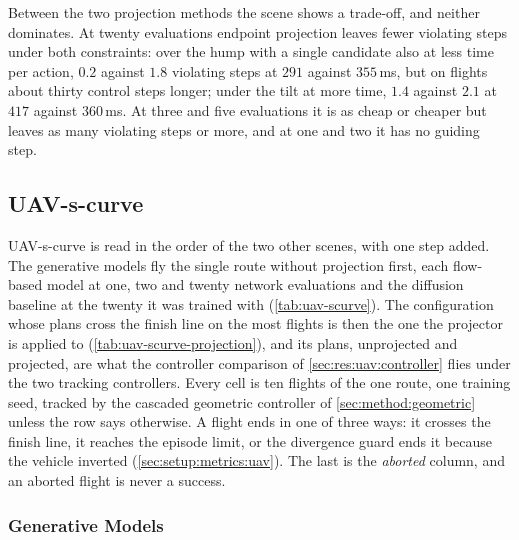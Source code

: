 Between the two projection methods the scene shows a trade-off, and neither dominates. At twenty evaluations
endpoint projection leaves fewer violating steps under both constraints: over the hump with a single
candidate also at less time per action, $0.2$ against $1.8$ violating steps at $291$ against $355$\,ms, but on
flights about thirty control steps longer; under the tilt at more time, $1.4$ against $2.1$ at $417$ against
$360$\,ms. At three and five evaluations it is as cheap or cheaper but leaves as many violating steps or more,
and at one and two it has no guiding step.

\FloatBarrier
\subsection{UAV-s-curve}\label{sec:res:uav:scurve}

UAV-s-curve is read in the order of the two other scenes, with one step added. The generative models
fly the single route without projection first, each flow-based model at one, two and twenty network
evaluations and the diffusion baseline at the twenty it was trained with (\autoref{tab:uav-scurve}). The
configuration whose plans cross the finish line on the most flights is then the one the projector is
applied to (\autoref{tab:uav-scurve-projection}), and its plans, unprojected and projected, are what the
controller comparison of \autoref{sec:res:uav:controller} flies under the two tracking controllers.
Every cell is ten flights of the one route, one training seed, tracked by the cascaded geometric
controller of \autoref{sec:method:geometric} unless the row says otherwise. A flight ends in one of
three ways: it crosses the finish line, it reaches the episode limit, or the divergence guard ends it
because the vehicle inverted (\autoref{sec:setup:metrics:uav}). The last is the \emph{aborted} column,
and an aborted flight is never a success.

\subsubsection{Generative Models}\label{sec:res:uav:scurve:models}


